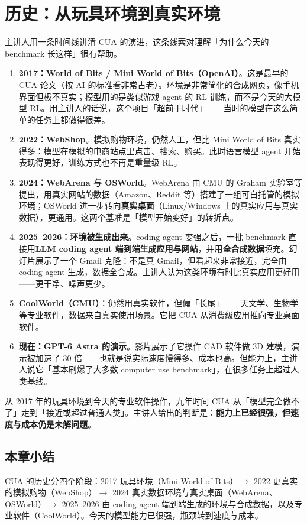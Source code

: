 ﻿\documentclass[a4paper]{article}
\begin{document}
\section{历史：从玩具环境到真实环境}

主讲人用一条时间线讲清 CUA 的演进，这条线索对理解「为什么今天的 benchmark 长这样」很有帮助。

\begin{enumerate}
\item \textbf{2017：World of Bits / Mini World of Bits（OpenAI）}。这是最早的 CUA 论文（按 AI 的标准看非常古老）。环境是非常简化的合成网页，像手机界面但极不真实；模型用的是类似游戏 agent 的 RL 训练，而不是今天的大模型 RL。用主讲人的话说，这个项目「超前于时代」——当时的模型在这么简单的任务上都做得很差。
\item \textbf{2022：WebShop}。模拟购物环境，仍然人工，但比 Mini World of Bits 真实得多：模型在模拟的电商站点里点击、搜索、购买。此时语言模型 agent 开始表现得更好，训练方式也不再是重量级 RL。
\item \textbf{2024：WebArena 与 OSWorld}。WebArena 由 CMU 的 Graham 实验室等提出，用真实网站的数据（Amazon、Reddit 等）搭建了一组可自托管的模拟环境；OSWorld 进一步转向\textbf{真实桌面}（Linux/Windows 上的真实应用与真实数据），更通用。这两个基准是「模型开始变好」的转折点。
\item \textbf{2025--2026：环境被生成出来}。coding agent 变强之后，一批 benchmark 直接用\textbf{LLM coding agent 端到端生成应用与网站}，并用\textbf{全合成数据}填充。幻灯片展示了一个 Gmail 克隆：不是真 Gmail，但看起来非常接近，完全由 coding agent 生成，数据全合成。主讲人认为这类环境有时比真实应用更好用——更干净、噪声更少。
\item \textbf{CoolWorld（CMU）}：仍然用真实软件，但偏「长尾」——天文学、生物学等专业软件，数据来自真实使用场景。它把 CUA 从消费级应用推向专业桌面软件。
\item \textbf{现在：GPT-6 Astra 的演示}。影片展示了它操作 CAD 软件做 3D 建模，演示被加速了 30 倍——也就是说实际速度慢得多、成本也高。但能力上，主讲人说它「基本刷爆了大多数 computer use benchmark」，在很多任务上超过人类基线。
\end{enumerate}

从 2017 年的玩具环境到今天的专业软件操作，九年时间 CUA 从「模型完全做不了」走到「接近或超过普通人类」。主讲人给出的判断是：\textbf{能力上已经很强，但速度与成本仍是未解问题}。

\subsection{本章小结}
CUA 的历史分四个阶段：2017 玩具环境（Mini World of Bits）$\rightarrow$ 2022 更真实的模拟购物（WebShop）$\rightarrow$ 2024 真实数据环境与真实桌面（WebArena、OSWorld）$\rightarrow$ 2025–2026 由 coding agent 端到端生成的环境与合成数据，以及专业软件（CoolWorld）。今天的模型能力已很强，瓶颈转到速度与成本。
\end{document}

